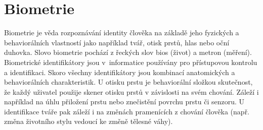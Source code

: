 


\chapter{Biometrie} 
Biometrie je věda rozpoznávání identity člověka na základě jeho fyzických a behaviorálních vlastností jako například tvář, otisk prstů, hlas nebo oční duhovka. \cite{Jain2008} Slovo biometrie pochází z řeckých slov bios (život) a metron (měření). Biometrické identifikátory jsou v~informatice používány pro přístupovou kontrolu a identifikaci. Skoro všechny identifikátory jsou kombinací anatomických a behaviorálních charakteristik. U otisku prstu je behaviorální složkou skutečnost, že každý uživatel použije skener otisku prstů v závislosti na svém chování. Záleží i například na úhlu přiložení prstu nebo znečistění povrchu prstu či senzoru. U identifikace tváře pak záleží i na změnách pramenících z chování člověka (např. změna životního stylu vedoucí ke změně tělesné váhy).\cite{Maltoni2009}
